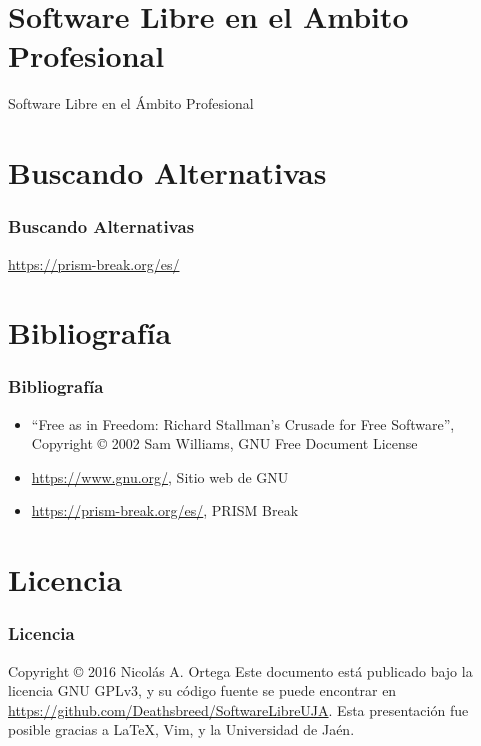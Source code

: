 \documentclass[xetex]{beamer}
\begin{document}

\section{Software Libre en el Ambito Profesional}
\begin{frame}
    \centering \Huge Software Libre en el Ámbito Profesional
\end{frame}


\section{Buscando Alternativas}
\begin{frame}
    \frametitle{Buscando Alternativas}
    \centering \Large \url{https://prism-break.org/es/}
\end{frame}


\section{Bibliografía}
\begin{frame}[t]
    \frametitle{Bibliografía}
    \begin{itemize}
        \item ``Free as in Freedom: Richard Stallman's Crusade for Free Software'', Copyright \copyright{} 2002 Sam Williams, GNU Free Document License
        \item \url{https://www.gnu.org/}, Sitio web de GNU
        \item \url{https://prism-break.org/es/}, PRISM Break
    \end{itemize}
\end{frame}


\section{Licencia}
\begin{frame}
    \frametitle{Licencia}
    Copyright \copyright{} 2016 Nicolás A. Ortega
    \linebreak{}
    \linebreak{}
    Este documento está publicado bajo la licencia GNU GPLv3, y su código fuente se puede encontrar en \url{https://github.com/Deathsbreed/SoftwareLibreUJA}.
    \linebreak{}
    \linebreak{}
    Esta presentación fue posible gracias a \LaTeX, Vim, y la Universidad de Jaén.
\end{frame}
\end{document}
